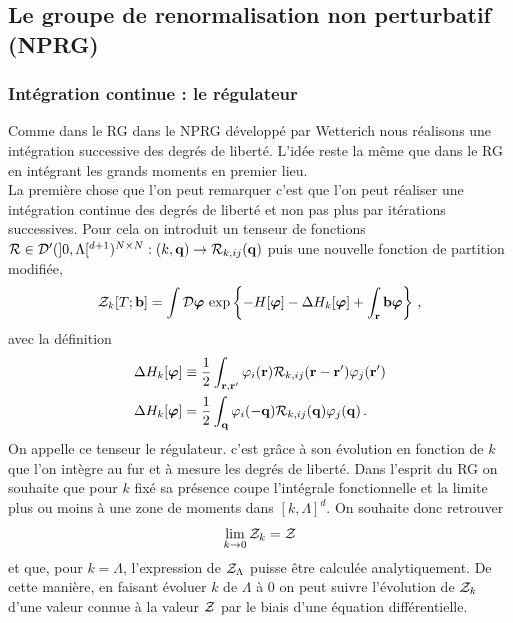 \documentclass[10.5pt]{article}
\begin{document}
\begin{multicols*}{2}
{\vspace*{11pt}


}



\vspace*{11pt}


\subsection{Le groupe de renormalisation non perturbatif (NPRG)}

\subsubsection{Intégration continue : le régulateur}
\label{sec:Reg}
Comme dans le RG dans le NPRG développé par Wetterich \cite{wetterich} nous réalisons une intégration successive des degrés de liberté. L'idée reste la même que dans le RG en intégrant les grands moments en premier lieu. \\

La première chose que l'on peut remarquer c'est que l'on peut réaliser une intégration continue des degrés de liberté et non pas plus par itérations successives. Pour cela on introduit un tenseur de fonctions  $\mathcal{R} \in \mathcal{D}'(]0, \Lambda[^{d+1})^{N\times N} : (k,{\bf q}) \to \mathcal{R}_{k, ij}({\bf q})$ puis une nouvelle fonction de partition modifiée,  
\begin{equation}
  \mathcal{Z}_k[T;{\bf b}] = \int \mathcal{D} \boldsymbol{ \varphi} \, \exp\left\{-H[\boldsymbol{ \varphi}] - \Delta H_k[\boldsymbol{ \varphi}] + \int_{{\bf r}} {\bf b} \boldsymbol{ \varphi} \right\} \, ,
\end{equation}
avec la définition
\begin{equation}
  \begin{split}
  \Delta H_k[\boldsymbol{ \varphi}]  & \equiv \frac{1}{2} \int_{{\bf r}, {\bf r}'} \varphi_i({\bf r}) \mathcal{R}_{k,ij}({\bf r} - {\bf r}') \varphi_j({\bf r}') \\
\Delta H_k[\boldsymbol{ \varphi}] & =  \frac{1}{2} \int_{{\bf q}} \varphi_i(-{\bf q}) \mathcal{R}_{k,ij}({\bf q}) \varphi_j({\bf q}) \, .
\end{split}
\end{equation}
On appelle ce tenseur le régulateur. c'est grâce à son évolution  en fonction de $k$ que l'on intègre au fur et à mesure les degrés de liberté. Dans l'esprit du RG on souhaite que pour $k$ fixé sa présence coupe l'intégrale fonctionnelle  et la limite plus ou moins à une zone de moments dans $[k, \Lambda]^d$. On souhaite donc retrouver 
\begin{equation}
\lim_{k \to 0} \mathcal{Z}_k = \mathcal{Z}
\end{equation}
et que, pour $k = \Lambda$, l'expression de $\mathcal{Z}_\Lambda$ puisse être calculée analytiquement. De cette manière, en faisant évoluer $k$ de $\Lambda$ à $0$ on peut suivre l'évolution de $\mathcal{Z}_k$ d'une valeur connue à la valeur $\mathcal{Z}$ par le biais d'une équation différentielle.\\


\end{multicols*}
\end{document}
